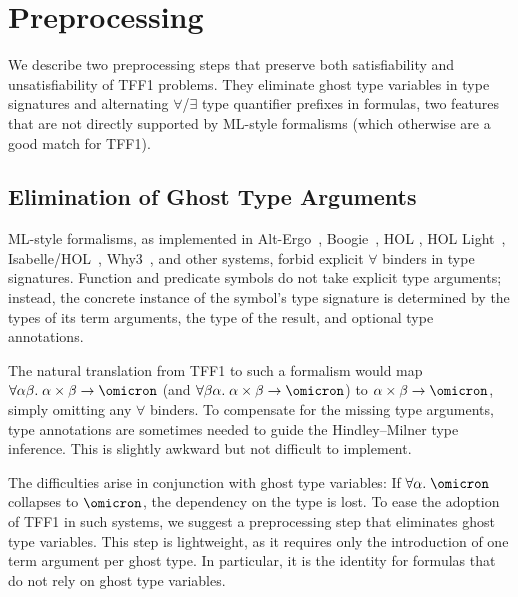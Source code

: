 \section{Preprocessing}

We describe two preprocessing steps that preserve both satisfiability and
unsatisfiability of TFF1 problems. They eliminate ghost type variables in type
signatures and alternating $\forall$/$\exists$ type quantifier prefixes in
formulas, two features that are not directly supported by ML-style formalisms
(which otherwise are a good match for TFF1).

\subsection{Elimination of Ghost Type Arguments} \label{ssec:ghost}


ML-style formalisms, as implemented in Alt-Ergo~\cite{conchon08smt},
Boogie~\cite{Barnett06boogie}, HOL \cite{gordon-melham-1993}, HOL
Light~\cite{harrison-1996}, Isabelle\slash HOL~\cite{nipkow-et-al-2002},
Why3~\cite{boogie11why3}, and other systems, forbid explicit $\forall$ binders
in type signatures. Function and predicate symbols do not take explicit type
arguments; instead, the concrete instance of the symbol's type signature is
determined by the types of its term arguments, the type of the result, and
optional type annotations.

The natural translation from TFF1 to such a formalism would map $\forall
\alpha\beta.\; \alpha\times\beta\to\omicron$ (and $\forall \beta\alpha.\;
\alpha\times\beta\to\omicron$) to $\alpha\times\beta\to\omicron$, simply
omitting any $\forall$ binders. To compensate for the missing type arguments,
type annotations are sometimes needed to guide the Hindley--Milner type
inference. This is slightly awkward but not difficult to implement.

The difficulties arise in conjunction with ghost type variables: If
$\forall\alpha.\;\omicron$ collapses to $\omicron$, the dependency on the type
is lost.
%
To ease the adoption of TFF1 in such systems, we suggest a preprocessing step
that eliminates ghost type variables. This step is lightweight, as it requires
only the introduction of one term argument per ghost type. In particular,
it is the identity for formulas that do not rely on ghost type variables.

